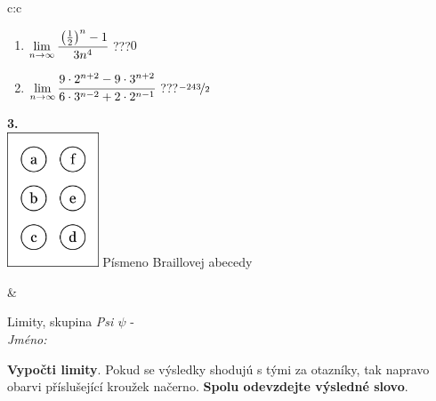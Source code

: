 \documentclass[10pt]{report}
\begin{document}
\begin{tabular}{c:c}
\begin{minipage}[c][104.5mm][t]{0.5\linewidth}
\begin{center}
\begin{minipage}{0.79\linewidth}
\begin{center}
\begin{varwidth}{\linewidth}
\begin{enumerate}
\item $\lim\limits_{n\to\infty}\cfrac{\left(\frac{1}{2}\right)^n -1}{3n^{4}}$\quad \dotfill\; ???\;\dotfill \quad $0$
\item $\lim\limits_{n\to\infty}\cfrac{9\cdot 2^{n+2}-9\cdot 3^{n+2}}{6\cdot 3^{n-2}+2\cdot 2^{n-1}}$\quad \dotfill\; ???\;\dotfill \quad $\nicefrac{-243}{2}$
\end{enumerate}
\end{varwidth}
\end{center}
\end{minipage}
\begin{minipage}{0.20\linewidth}
\begin{center}
{\Huge\bfseries 3.} \\[2mm]
\includegraphics[height=40mm]{../images/braille.png}
{\small Písmeno Braillovej abecedy}
\end{center}
\end{minipage}
\end{center}
\end{minipage}
&
\begin{minipage}[c][104.5mm][t]{0.5\linewidth}
\begin{center}
\vspace{7mm}
{\huge Limity, skupina \textit{Psi $\psi$} -}\\[5mm]
\textit{Jméno:}\phantom{xxxxxxxxxxxxxxxxxxxxxxxxxxxxxxxxxxxxxxxxxxxxxxxxxxxxxxxxxxxxxxxxx}\\[5mm]
\begin{minipage}{0.95\linewidth}
\begin{center}
\textbf{Vypočti limity}. Pokud se výsledky shodujú s tými za otazníky, tak napravo\\obarvi příslušející kroužek načerno. \textbf{Spolu odevzdejte výsledné slovo}.
\end{center}
\end{minipage}
\\[1mm]
\begin{minipage}{0.79\linewidth}
\begin{center}
\begin{varwidth}{\linewidth}

\end{varwidth}
\end{center}
\end{minipage}
\end{center}
\end{minipage}
\end{tabular}
\end{document}
